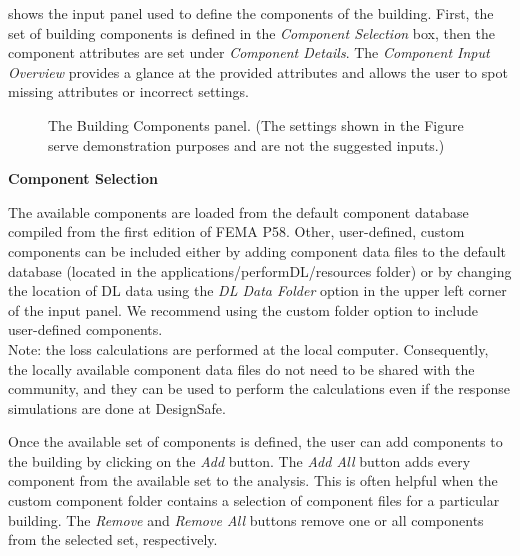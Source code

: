  shows the input panel used to define the components of the building. First, the set of building components is defined in the \textit{Component Selection} box, then the component attributes are set under \textit{Component Details}. The \textit{Component Input Overview} provides a glance at the provided attributes and allows the user to spot missing attributes or incorrect settings.

\begin{figure}[!htbp]
  \caption{The Building Components panel. (The settings shown in the Figure serve demonstration purposes and are not the suggested inputs.)}
  \label{fig:dl_p58_comp}
\end{figure}

\vspace{12pt}
\textbf{Component Selection}
\vspace{6pt}

The available components are loaded from the default component database compiled from the first edition of FEMA P58. Other, user-defined, custom components can be included either by adding component data files to the default database (located in the applications/performDL/resources folder) or by changing the location of DL data using the \textit{DL Data Folder} option in the upper left corner of the input panel. We recommend using the custom folder option to include user-defined components.\\
Note: the loss calculations are performed at the local computer. Consequently, the locally available component data files do not need to be shared with the community, and they can be used to perform the calculations even if the response simulations are done at DesignSafe.

Once the available set of components is defined, the user can add components to the building by clicking on the \textit{Add} button. The \textit{Add All} button adds every component from the available set to the analysis. This is often helpful when the custom component folder contains a selection of component files for a particular building. The \textit{Remove} and \textit{Remove All} buttons remove one or all components from the selected set, respectively.

